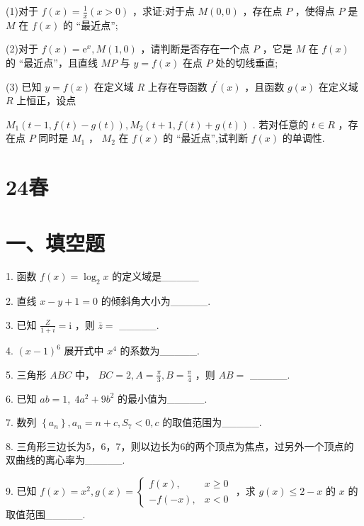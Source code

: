\documentclass[10pt]{article}
\begin{document}
(1)对于 \(f\left( x\right)  = \frac{1}{x}\left( {x > 0}\right)\) ，求证:对于点 \(M\left( {0,0}\right)\) ，存在点 \(P\) ，使得点 \(P\) 是 \(M\) 在 \(f\left( x\right)\) 的 “最近点”;

(2)对于 \(f\left( x\right)  = {\mathrm{e}}^{x},M\left( {1,0}\right)\) ，请判断是否存在一个点 \(P\) ，它是 \(M\) 在 \(f\left( x\right)\) 的 “最近点”，且直线 \({MP}\) 与 \(y = f\left( x\right)\) 在点 \(P\) 处的切线垂直;

(3) 已知 \(y = f\left( x\right)\) 在定义域 \(R\) 上存在导函数 \({f}^{\prime }\left( x\right)\) ，且函数 \(g\left( x\right)\) 在定义域 \(R\) 上恒正，设点

\({M}_{1}\left( {t - 1,f\left( t\right)  - g\left( t\right) }\right) ,{M}_{2}\left( {t + 1,f\left( t\right)  + g\left( t\right) }\right)\) . 若对任意的 \(t \in  R\) ，存在点 \(P\) 同时是 \({M}_{1}\) ， \({M}_{2}\) 在 \(f\left( x\right)\) 的 “最近点”,试判断 \(f\left( x\right)\) 的单调性.

\section*{24春}

\section*{一、填空题}

1. 函数 \(f\left( x\right)  = {\log }_{2}x\) 的定义域是\_\_\_\_\_

2. 直线 \(x - y + 1 = 0\) 的倾斜角大小为\_\_\_\_\_.

3. 已知 \(\frac{Z}{1 + i} = \mathrm{i}\) ，则 \(\bar{z} =\) \_\_\_\_\_.

4. \({\left( x - 1\right) }^{6}\) 展开式中 \({x}^{4}\) 的系数为\_\_\_\_\_.

5. 三角形 \({ABC}\) 中， \({BC} = 2,A = \frac{\pi }{3},B = \frac{\pi }{4}\) ，则 \({AB} =\) \_\_\_\_\_.

6. 已知 \({ab} = 1,\;4{a}^{2} + 9{b}^{2}\) 的最小值为\_\_\_\_\_.

7. 数列 \(\left\{  {a}_{n}\right\}  ,{a}_{n} = n + c,{S}_{7} < 0,c\) 的取值范围为\_\_\_\_\_.

8. 三角形三边长为5，6，7，则以边长为6的两个顶点为焦点，过另外一个顶点的双曲线的离心率为\_\_\_\_\_.

9. 已知 \(f\left( x\right)  = {x}^{2},g\left( x\right)  = \left\{  \begin{array}{ll} f\left( x\right) , & x \geq  0 \\   - f\left( {-x}\right) , & x < 0 \end{array}\right.\) ，求 \(g\left( x\right)  \leq  2 - x\) 的 \(x\) 的取值范围\_\_\_\_\_.
\end{document}
